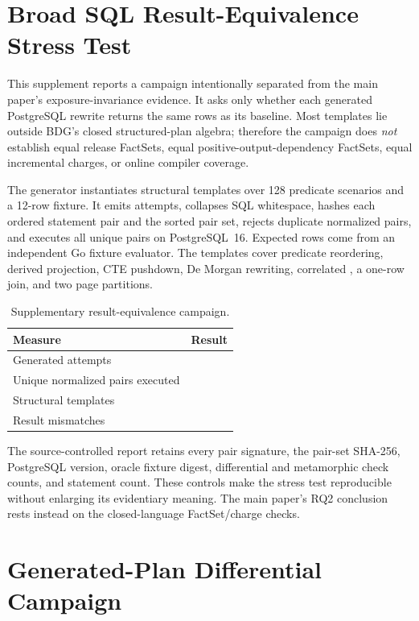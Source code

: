 \documentclass[journal,onecolumn]{IEEEtran}
\newcommand{\code}[1]{\texttt{\detokenize{#1}}}
\begin{document}
\section{Broad SQL Result-Equivalence Stress Test}

This supplement reports a campaign intentionally separated from the main
paper's exposure-invariance evidence.  It asks only whether each generated
PostgreSQL rewrite returns the same rows as its baseline.  Most templates lie
outside BDG's closed structured-plan algebra; therefore the campaign does
\emph{not} establish equal release FactSets, equal positive-output-dependency
FactSets, equal incremental charges, or online compiler coverage.

The generator instantiates \RQTwoTemplates{} structural templates over 128
predicate scenarios and a 12-row fixture.  It emits \RQTwoPairs{} attempts,
collapses SQL whitespace, hashes each ordered statement pair and the sorted
pair set, rejects duplicate normalized pairs, and executes all
\RQTwoUnique{} unique pairs on PostgreSQL~16. Expected rows come from an
independent Go fixture evaluator.  The templates cover predicate reordering,
derived projection, CTE pushdown, De Morgan rewriting, correlated
\code{EXISTS}, a one-row \code{VALUES} join, and two page partitions.

\begin{table}[h]
\centering
\caption{Supplementary result-equivalence campaign.}
\small
\begin{tabular}{L{0.58\columnwidth}r}
\toprule
Measure & Result \\
\midrule
Generated attempts & \RQTwoPairs{} \\
Unique normalized pairs executed & \RQTwoUnique{} \\
Structural templates & \RQTwoTemplates{} \\
Result mismatches & \RQTwoMismatches{} \\
\bottomrule
\end{tabular}
\end{table}

The source-controlled report retains every pair signature, the pair-set
SHA-256, PostgreSQL version, oracle fixture digest, differential and
metamorphic check counts, and statement count.  These controls make the stress
test reproducible without enlarging its evidentiary meaning.  The main paper's
RQ2 conclusion rests instead on the closed-language FactSet/charge checks.

\section{Generated-Plan Differential Campaign}
\label{sec:generated-supp}
\end{document}
